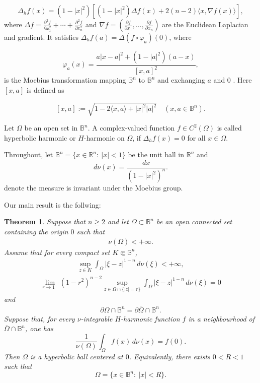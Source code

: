 \documentclass[12pt]{amsart}
\numberwithin{equation}{section}
\newcommand{\Bn}{\mathbb B^n}
\newcommand{\Rn}{\mathbb R^n}
\newcommand{\Dh}{\Delta_h}
\newtheorem{theorem}{Theorem}
\theoremstyle{plain}
\numberwithin{equation}{section}
\numberwithin{theorem}{section}
\numberwithin{proposition}{section}
\begin{document}
$$
\Dh f(x)=\left(1-|x|^{2}\right)\left[\left(1-|x|^{2}\right) \Delta f(x)+2(n-2)\langle x, \nabla f(x)\rangle\right],
$$
where $\Delta f=\frac{\partial^{2} f}{\partial x_{1}^{2}}+\cdots+\frac{\partial^{2} f}{\partial x_{n}^{2}}$ and $\nabla f=\left(\frac{\partial f}{\partial x_{1}}, \ldots, \frac{\partial f}{\partial x_{n}}\right)$ are the Euclidean Laplacian and gradient. It  satisfies  $\Delta_{h} f(a)=\Delta\left(f \circ \varphi_{a}\right)(0)$, where

$$
\varphi_{a}(x)=\frac{a|x-a|^{2}+\left(1-|a|^{2}\right)(a-x)}{[x, a]^{2}},
$$
is the Moebius transformation mapping $\Bn$ to $\Bn$ and exchanging $a$ and 0 . Here $[x, a]$ is defined as

$$
[x, a]:=\sqrt{1-2\langle x, a\rangle+|x|^{2}|a|^{2}} \quad(x, a \in \Bn) .
$$

Let $\Omega$ be an open set in $\Bn$.  A complex-valued function $f \in C^{2}(\Omega)$ is called hyperbolic harmonic or $H$-harmonic  on $\Omega$, if $\Delta_{h} f(x)=0$ for all $x \in \Omega$.


Throughout, let 
$
\Bn=\{x\in\Rn:\ |x|<1\}$ be the unit ball in ${\mathbb R}^n$ 
and 
\[d\nu(x)=\frac{dx}{(1-|x|^2)^n}.
\]
denote the measure is invariant under the Moebius group.

 Our main result is the follwing:
\begin{theorem}\label{main}
Suppose that \(n\ge2\) and let \(\Omega\subset \Bn\) be an open connected set  containing the origin $0$ such that
\begin{eqnarray}\label{finiteVol}
\nu(\Omega)<+\infty.
\end{eqnarray}
Assume that for every compact set \(K\Subset\mathbb B^n\),
\begin{eqnarray}\label{C1cond}
\sup_{z\in K}
\int_\Omega |\xi-z|^{1-n}\,d\nu(\xi)
<+\infty,
\end{eqnarray}
\begin{eqnarray}\label{C1bcond}
\lim_{r\to1^-} (1-r^2)^{n-2}
\sup_{z\in\Omega\cap\{|z|=r\}}
\int_\Omega |\xi-z|^{1-n}\,d\nu(\xi)=0
\end{eqnarray}
and
\begin{eqnarray}\label{Topcond}
\partial\Omega\cap\mathbb B^n =\partial\overline{\Omega}\cap\mathbb B^n.
\end{eqnarray}
Suppose that, for every $\nu$-integrable  \(H\)-harmonic function \(f\) in a neighbourhood of
\(\overline{\Omega} \cap\mathbb B^n\), one has
\[
\frac1{\nu(\Omega)}\int_\Omega f(x)\,d\nu(x)=f(0).
\]
Then \(\Omega\) is a hyperbolic ball centered at \(0\). Equivalently, there
exists \(0<R<1\) such that
\[
\Omega=\{x\in\Bn:\ |x|<R\}.
\]
\end{theorem}
\end{document}
